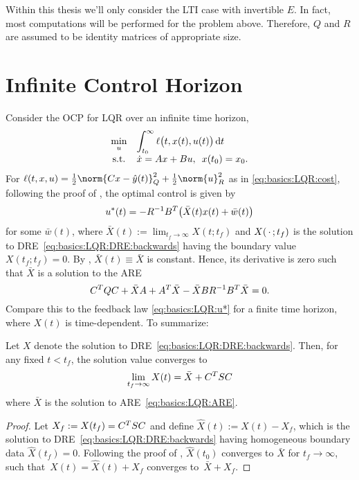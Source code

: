 Within this thesis we'll only consider the \ac{LTI} case with invertible $E$.
In fact, most computations will be performed for the problem above.
Therefore, $Q$ and $R$ are assumed to be identity matrices of appropriate size.

\section{Infinite Control Horizon}

Consider the \ac{OCP} for \ac{LQR} over an infinite time horizon,
\begin{equation}
\label{eq:basics:OCP'}
  \everymath{\displaystyle}
  \begin{array}{cl}
    \min_u & \int_{t_0}^{\infty} \ell\big(t, x(t), u(t)\big) \dt \\
    \text{s.t.} & \dot{x} = Ax + Bu, \enspace x(t_0) = x_0
    .
  \end{array}
\end{equation}
For
$
  \ell(t, x, u) = \onehalf \norm{Cx - \hat y(t)}_Q^2 + \onehalf \norm{u}_R^2
$
as in \eqref{eq:basics:LQR:cost},
following the proof of \cite[Theorem~3.2]{Locatelli2011},
the optimal control is given by
\begin{equation}
  u^*(t) = - R^{-1} B^T \big( \bar X(t) x(t) + \bar w(t) \big)
\end{equation}
for some $\bar w(t)$,
where $\bar X(t) := \lim_{t_f \to\infty} X(t; t_f)$
and $X(\optional{};t_f)$ is the solution to \ac{DRE}~\eqref{eq:basics:LQR:DRE:backwards}
having the boundary value $X(t_f; t_f) = 0$. %
By \cite[Theorem~3.3]{Locatelli2011},
$\bar X(t) \equiv \bar X$ is constant.
Hence, its derivative is zero such that $\bar X$ is a solution to the \ac{ARE}
\begin{equation}
\label{eq:basics:LQR:ARE}
  C^T Q C + \bar X A + A^T \bar X - \bar X B R^{-1} B^T \bar X = 0
  .
\end{equation}
Compare this to the feedback law \eqref{eq:basics:LQR:u*} for a finite time horizon,
where $X(t)$ is time-dependent.
To summarize:

\begin{proposition}
\label{thm:basics:dre-limit-are:backwards}
  Let $X$ denote the solution to \ac{DRE}~\eqref{eq:basics:LQR:DRE:backwards}.
  Then, for any fixed $t < t_f$, the solution value converges to
  \begin{equation}
    \lim_{t_f\to\infty} X(t) = \bar X + C^T S C
  \end{equation}
  where $\bar X$ is the solution to \ac{ARE}~\eqref{eq:basics:LQR:ARE}.
\end{proposition}
\begin{proof}
  Let $X_f := X(t_f) = C^T S C$ and
  define $\hat X(t) := X(t) - X_f$,
  which is the solution to \ac{DRE}~\eqref{eq:basics:LQR:DRE:backwards} having homogeneous boundary data $\hat X(t_f) = 0$.
  Following the proof of \cite[Theorem~3.3]{Locatelli2011},
  $\hat X(t_0)$ converges to $\bar X$ for $t_f\to\infty$,
  such that~\mbox{$X(t) = \hat X(t) + X_f$} converges to~\mbox{$\bar X + X_f$}.
\end{proof}

